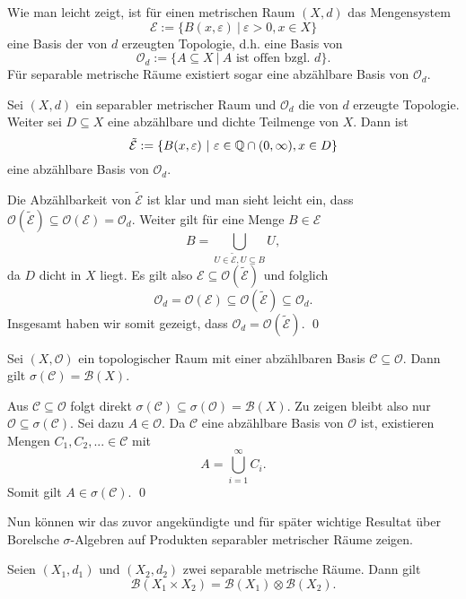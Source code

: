 Wie man leicht zeigt, ist für einen metrischen Raum $(X,d)$ das Mengensystem 
$$
    \mathcal{E} := \{B(x, \varepsilon) \ | \ \varepsilon > 0, x \in X \}
$$
eine Basis der von $d$ erzeugten Topologie, d.h. eine Basis von 
$$
    \mathcal{O}_d := \{A \subseteq X \ | \ A \text{ ist offen bzgl. } d\}. 
$$
Für separable metrische Räume existiert sogar eine abzählbare Basis von $\mathcal{O}_d$. 

\begin{lemma}
    Sei $(X,d)$ ein separabler metrischer Raum und $\mathcal{O}_d$ die von $d$ erzeugte Topologie. Weiter sei $D \subseteq X$ eine abzählbare und dichte Teilmenge von $X$. Dann ist 
    $$
        \tilde{\mathcal{E}} := \{B(x, \varepsilon) \ | \ \varepsilon \in \mathbb{Q} \cap (0,\infty), x \in D\}
    $$
    eine abzählbare Basis von $\mathcal{O}_d$. 
\end{lemma}

\begin{proof*}
    Die Abzählbarkeit von $\tilde{\mathcal{E}}$ ist klar und man sieht leicht ein, dass $\mathcal{O}(\tilde{\mathcal{E}}) \subseteq \mathcal{O}(\mathcal{E}) = \mathcal{O}_d$. Weiter gilt für eine Menge $B \in \mathcal{E}$
    $$
        B = \bigcup_{U \in \tilde{\mathcal{E}}, U \subseteq B}U,
    $$ 
    da $D$ dicht in $X$ liegt. Es gilt also $\mathcal{E} \subseteq \mathcal{O}({\tilde{\mathcal{E}}})$ und folglich
    $$
        \mathcal{O}_d = \mathcal{O}(\mathcal{E}) \subseteq \mathcal{O}({\tilde{\mathcal{E}}}) \subseteq \mathcal{O}_d. 
    $$
    Insgesamt haben wir somit gezeigt, dass $\mathcal{O}_d = \mathcal{O}(\tilde{\mathcal{E}})$. \qed
\end{proof*}    

\begin{lemma}
    Sei $(X, \mathcal{O})$ ein topologischer Raum mit einer abzählbaren Basis $\mathcal{C} \subseteq \mathcal{O}$. Dann gilt $\sigma(\mathcal{C}) = \mathcal{B}(X)$. 
\end{lemma}

\begin{proof*}
    Aus $\mathcal{C} \subseteq \mathcal{O}$ folgt direkt $\sigma(\mathcal{C}) \subseteq \sigma(\mathcal{O}) = \mathcal{B}(X)$. Zu zeigen bleibt also nur $\mathcal{O} \subseteq \sigma(\mathcal{C})$. Sei dazu $A \in \mathcal{O}$. 
    Da $\mathcal{C}$ eine abzählbare Basis von $\mathcal{O}$ ist, existieren Mengen $C_1, C_2,... \in \mathcal{C}$ mit 
    $$
        A = \bigcup_{i=1}^{\infty}C_i.
    $$ 
    Somit gilt $A \in \sigma(\mathcal{C})$. \qed 
\end{proof*}
Nun können wir das zuvor angekündigte und für später wichtige Resultat über Borelsche $\sigma$-Algebren auf Produkten separabler metrischer Räume zeigen. 
\begin{proposition}
    Seien $(X_1, d_1)$ und $(X_2, d_2)$ zwei separable metrische Räume. Dann gilt 
    $$
        \mathcal{B}(X_1 \times X_2) = \mathcal{B}(X_1) \otimes \mathcal{B}(X_2). 
    $$
\end{proposition}

